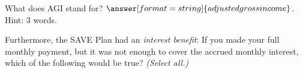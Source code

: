 \documentclass[handout,space,nooutcomes]{ximera}
\begin{document}
\begin{question}
\begin{question}
\begin{question}
\begin{question}
What does AGI stand for?  $\answer[format=string]{adjusted gross income}$. Hint: 3 words. 

Furthermore, the SAVE Plan had an \emph{interest benefit}: If you made your full monthly payment, but it was not enough to cover the accrued monthly interest, which of the following would be true? \emph{(Select all.)} 
\begin{selectAll}
\end{selectAll}
\end{question}
\end{question}
\end{question}
\end{question}
\end{document}
